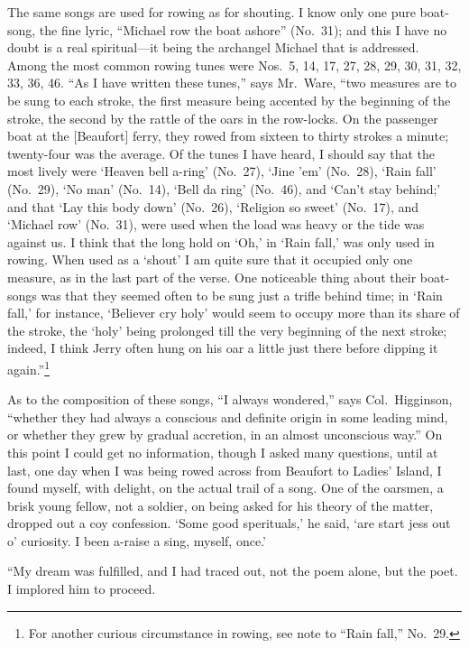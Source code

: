 \documentclass[a5paper,10pt]{book}
\begin{document}
The same songs are used for rowing as for shouting.  I know only one
pure boat-song, the fine lyric, ``Michael row the boat ashore''
(No.~31); and this I have no doubt is a real spiritual---it being the
archangel Michael that is addressed.  Among the most common rowing
tunes were Nos.~5, 14, 17, 27, 28, 29, 30, 31, 32, 33, 36, 46.  ``As I
have written these tunes,'' says Mr.~Ware, ``two measures are to be
sung to each stroke, the first measure being accented by the beginning
of the stroke, the second by the rattle of the oars in the row-locks.
On the passenger boat at the [Beaufort] ferry, they rowed from sixteen
to thirty strokes a minute; twenty-four was the average.  Of the tunes
I have heard, I should say that the most lively were `Heaven bell
a-ring' (No.~27), `Jine 'em' (No.~28), `Rain fall' (No.~29), `No man'
(No.~14), `Bell da ring' (No.~46), and `Can't stay behind;' and that
`Lay this body down' (No.~26), `Religion so sweet' (No.~17), and
`Michael row' (No.~31), were used when the load was heavy or the tide
was against us.  I think that the long hold on `Oh,' in `Rain fall,'
was only used in rowing.  When used as a `shout' I am quite sure that
it occupied only one measure, as in the last part of the verse.  One
noticeable thing about their boat-songs was that they seemed often to
be sung just a trifle behind time; in `Rain fall,' for instance,
`Believer cry holy' would seem to occupy more than its share of the
stroke, the `holy' being prolonged till the very beginning of the next
stroke; indeed, I think Jerry often hung on his oar a little just
there before dipping it again.''\footnote{For another curious
circumstance in rowing, see note to ``Rain fall,'' No.~29.}

As to the composition of these songs, ``I always wondered,'' says
Col.~Higginson, ``whether they had always a conscious and definite
origin in some leading mind, or whether they grew by gradual
accretion, in an almost unconscious way.''  On this point I could get
no information, though I asked many questions, until at last, one day
when I was being rowed across from Beaufort to Ladies' Island, I found
myself, with delight, on the actual trail of a song.  One of the
oarsmen, a brisk young fellow, not a soldier, on being asked for his
theory of the matter, dropped out a coy confession.  `Some good
sperituals,' he said, `are start jess out o' curiosity.  I been
a-raise a sing, myself, once.'

``My dream was fulfilled, and I had traced out, not the poem alone,
but the poet.  I implored him to proceed.
\end{document}
